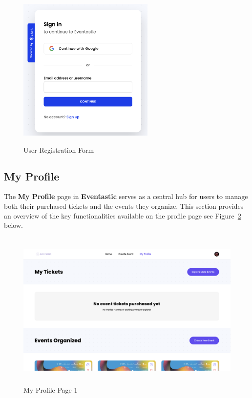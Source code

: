 \begin{figure}[H]
	\centering	\includegraphics[width=0.6\textwidth,height=300px,frame]{images/login.png}
	\caption{User Registration Form}
        \label{fig:login}
\end{figure}


\subsection{My Profile}
The \textbf{My Profile} page in \textbf{Eventastic} serves as a central hub for users to manage both their purchased tickets and the events they organize. This section provides an overview of the key functionalities available on the profile page see Figure~\ref{fig:profile1} below.

\begin{figure}[H]
	\centering	\includegraphics[width=1.0\textwidth,height=300px,frame]{images/profile1.png}
	\caption{My Profile Page 1}
        \label{fig:profile1}
\end{figure}

